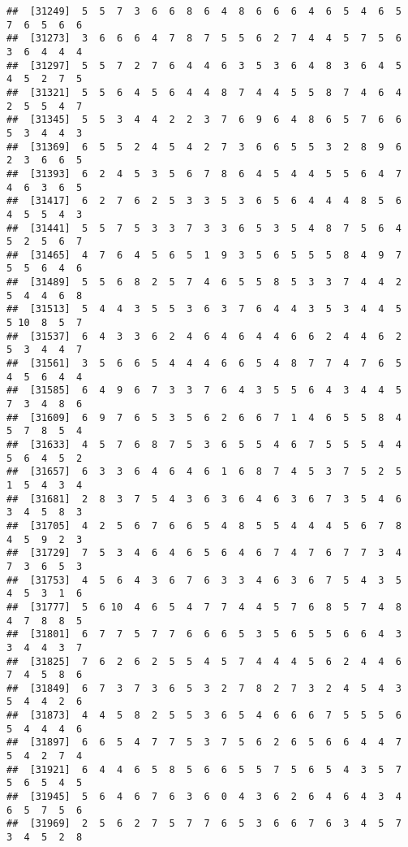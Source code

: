 \documentclass[
]{book}
\begin{document}
\begin{verbatim}
##  [31249]  5  5  7  3  6  6  8  6  4  8  6  6  6  4  6  5  4  6  5  7  6  5  6  6
##  [31273]  3  6  6  6  4  7  8  7  5  5  6  2  7  4  4  5  7  5  6  3  6  4  4  4
##  [31297]  5  5  7  2  7  6  4  4  6  3  5  3  6  4  8  3  6  4  5  4  5  2  7  5
##  [31321]  5  5  6  4  5  6  4  4  8  7  4  4  5  5  8  7  4  6  4  2  5  5  4  7
##  [31345]  5  5  3  4  4  2  2  3  7  6  9  6  4  8  6  5  7  6  6  5  3  4  4  3
##  [31369]  6  5  5  2  4  5  4  2  7  3  6  6  5  5  3  2  8  9  6  2  3  6  6  5
##  [31393]  6  2  4  5  3  5  6  7  8  6  4  5  4  4  5  5  6  4  7  4  6  3  6  5
##  [31417]  6  2  7  6  2  5  3  3  5  3  6  5  6  4  4  4  8  5  6  4  5  5  4  3
##  [31441]  5  5  7  5  3  3  7  3  3  6  5  3  5  4  8  7  5  6  4  5  2  5  6  7
##  [31465]  4  7  6  4  5  6  5  1  9  3  5  6  5  5  5  8  4  9  7  5  5  6  4  6
##  [31489]  5  5  6  8  2  5  7  4  6  5  5  8  5  3  3  7  4  4  2  5  4  4  6  8
##  [31513]  5  4  4  3  5  5  3  6  3  7  6  4  4  3  5  3  4  4  5  5 10  8  5  7
##  [31537]  6  4  3  3  6  2  4  6  4  6  4  4  6  6  2  4  4  6  2  5  3  4  4  7
##  [31561]  3  5  6  6  5  4  4  4  6  6  5  4  8  7  7  4  7  6  5  4  5  6  4  4
##  [31585]  6  4  9  6  7  3  3  7  6  4  3  5  5  6  4  3  4  4  5  7  3  4  8  6
##  [31609]  6  9  7  6  5  3  5  6  2  6  6  7  1  4  6  5  5  8  4  5  7  8  5  4
##  [31633]  4  5  7  6  8  7  5  3  6  5  5  4  6  7  5  5  5  4  4  5  6  4  5  2
##  [31657]  6  3  3  6  4  6  4  6  1  6  8  7  4  5  3  7  5  2  5  1  5  4  3  4
##  [31681]  2  8  3  7  5  4  3  6  3  6  4  6  3  6  7  3  5  4  6  3  4  5  8  3
##  [31705]  4  2  5  6  7  6  6  5  4  8  5  5  4  4  4  5  6  7  8  4  5  9  2  3
##  [31729]  7  5  3  4  6  4  6  5  6  4  6  7  4  7  6  7  7  3  4  7  3  6  5  3
##  [31753]  4  5  6  4  3  6  7  6  3  3  4  6  3  6  7  5  4  3  5  4  5  3  1  6
##  [31777]  5  6 10  4  6  5  4  7  7  4  4  5  7  6  8  5  7  4  8  4  7  8  8  5
##  [31801]  6  7  7  5  7  7  6  6  6  5  3  5  6  5  5  6  6  4  3  3  4  4  3  7
##  [31825]  7  6  2  6  2  5  5  4  5  7  4  4  4  5  6  2  4  4  6  7  4  5  8  6
##  [31849]  6  7  3  7  3  6  5  3  2  7  8  2  7  3  2  4  5  4  3  5  4  4  2  6
##  [31873]  4  4  5  8  2  5  5  3  6  5  4  6  6  6  7  5  5  5  6  5  4  4  4  6
##  [31897]  6  6  5  4  7  7  5  3  7  5  6  2  6  5  6  6  4  4  7  5  4  2  7  4
##  [31921]  6  4  4  6  5  8  5  6  6  5  5  7  5  6  5  4  3  5  7  5  6  5  4  5
##  [31945]  5  6  4  6  7  6  3  6  0  4  3  6  2  6  4  6  4  3  4  6  5  7  5  6
##  [31969]  2  5  6  2  7  5  7  7  6  5  3  6  6  7  6  3  4  5  7  3  4  5  2  8

\end{verbatim}
\end{document}
